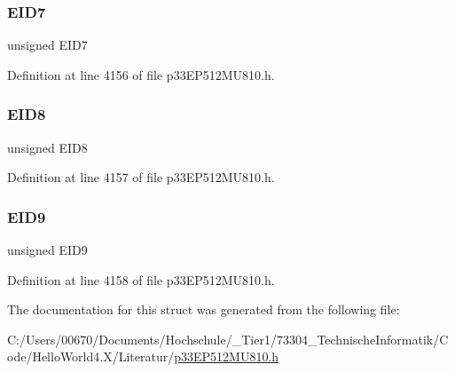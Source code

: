 \subsubsection{\texorpdfstring{E\+I\+D7}{EID7}}
{\footnotesize\ttfamily unsigned E\+I\+D7}



Definition at line 4156 of file p33\+E\+P512\+M\+U810.\+h.

\mbox{\label{structtag_c1_r_x_f7_e_i_d_b_i_t_s_acca25e0b7d86eb499d01f85222baea87}} 
\subsubsection{\texorpdfstring{E\+I\+D8}{EID8}}
{\footnotesize\ttfamily unsigned E\+I\+D8}



Definition at line 4157 of file p33\+E\+P512\+M\+U810.\+h.

\mbox{\label{structtag_c1_r_x_f7_e_i_d_b_i_t_s_ac6748f73d4ada8538b06548be4f396c2}} 
\subsubsection{\texorpdfstring{E\+I\+D9}{EID9}}
{\footnotesize\ttfamily unsigned E\+I\+D9}



Definition at line 4158 of file p33\+E\+P512\+M\+U810.\+h.



The documentation for this struct was generated from the following file\+:\begin{DoxyCompactItemize}
\item 
C\+:/\+Users/00670/\+Documents/\+Hochschule/\+\_\+\+Tier1/73304\+\_\+\+Technische\+Informatik/\+Code/\+Hello\+World4.\+X/\+Literatur/\hyperlink{p33_e_p512_m_u810_8h}{p33\+E\+P512\+M\+U810.\+h}\end{DoxyCompactItemize}
